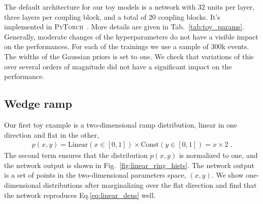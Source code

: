 The default architecture for our toy models is a
network with 32 units per layer, three layers per
coupling block, and a total of 20 coupling blocks. 
It's implemented in \textsc{PyTorch}~\cite{pytorch}. More details are
given in Tab.~\ref{tab:toy_params}.  Generally, moderate changes 
of the hyperparameters do not have a visible impact on the
performances. For each of the trainings we use a sample of 300k
events. The widths of the Gaussian priors is set to one. We check that
variations of this over several orders of magnitude did not have a
significant impact on the performance.

\subsection{Wedge ramp}
\label{sec:toy_wedge}

Our first toy example is a two-dimensional ramp distribution, linear
in one direction and flat in the other,
%
\begin{align}
p(x, y) = \text{Linear}(x \in [0, 1]) \times \text{Const}(y \in [0, 1]) = x \times 2 \; .
\label{eq:linear_dens}
\end{align}
%
The second term ensures that the distribution $p(x,y)$ is normalized
to one, and the network output is shown in
Fig.~\ref{fig:linear_ring_hists}. The network output is a set of points in the 
two-dimensional parameters space, $(x,y)$. We show
one-dimensional distributions after marginalizing over the flat
direction and find that the network reproduces
Eq.\eqref{eq:linear_dens} well.

